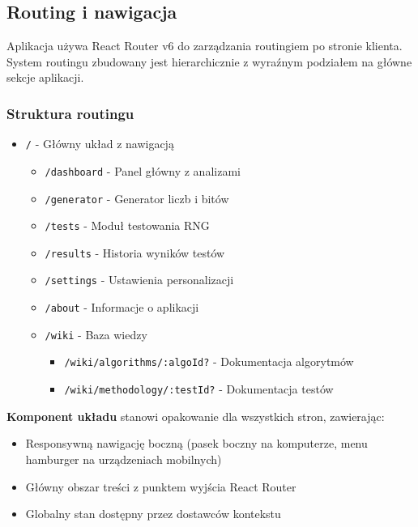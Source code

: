 \documentclass[12pt,a4paper]{article}
\begin{document}
\newpage

\subsection{Routing i nawigacja}

Aplikacja używa React Router v6 do zarządzania routingiem po stronie klienta. System routingu zbudowany jest hierarchicznie z wyraźnym podziałem na główne sekcje aplikacji.

\subsubsection{Struktura routingu}

\begin{tcolorbox}[colback=yellow!5!white,colframe=yellow!75!black,title=Hierarchia tras]
\begin{itemize}
    \item \texttt{/} - Główny układ z nawigacją
    \begin{itemize}
        \item \texttt{/dashboard} - Panel główny z analizami
        \item \texttt{/generator} - Generator liczb i bitów
        \item \texttt{/tests} - Moduł testowania RNG
        \item \texttt{/results} - Historia wyników testów
        \item \texttt{/settings} - Ustawienia personalizacji
        \item \texttt{/about} - Informacje o aplikacji
        \item \texttt{/wiki} - Baza wiedzy
        \begin{itemize}
            \item \texttt{/wiki/algorithms/:algoId?} - Dokumentacja algorytmów
            \item \texttt{/wiki/methodology/:testId?} - Dokumentacja testów
        \end{itemize}
    \end{itemize}
\end{itemize}
\end{tcolorbox}

\textbf{Komponent układu} stanowi opakowanie dla wszystkich stron, zawierając:
\begin{itemize}
    \item Responsywną nawigację boczną (pasek boczny na komputerze, menu hamburger na urządzeniach mobilnych)
    \item Główny obszar treści z punktem wyjścia React Router
    \item Globalny stan dostępny przez dostawców kontekstu
\end{itemize}
\end{document}
